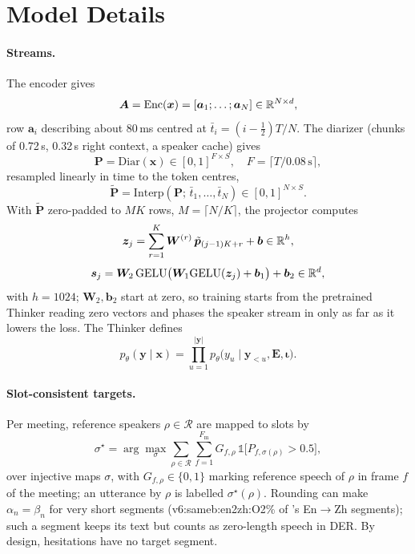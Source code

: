 \section{Model Details}
\label{app:model}

\paragraph{Streams.} The encoder gives
\begin{equation}
\bm{A}=\mathrm{Enc}(\bm{x})=[\bm{a}_1;\dots;\bm{a}_N]\in\mathbb{R}^{N\times d},
\label{eq:enc}
\end{equation}
row $\bm{a}_i$ describing about 80\,ms centred at $\bar{t}_i=(i-\tfrac12)T/N$. The diarizer (chunks of 0.72\,s, 0.32\,s right
context, a speaker cache) gives
\begin{equation}
\bm{P}=\mathrm{Diar}(\bm{x})\in[0,1]^{F\times S},\quad F=\lceil T/0.08\,\mathrm{s}\rceil,
\label{eq:diar}
\end{equation}
resampled linearly in time to the token centres,
\begin{equation}
\tilde{\bm{P}}=\mathrm{Interp}(\bm{P};\,\bar{t}_1,\dots,\bar{t}_N)\in[0,1]^{N\times S}.
\label{eq:interp}
\end{equation}
With $\tilde{\bm{P}}$ zero-padded to $MK$ rows, $M=\lceil N/K\rceil$, the projector computes
\begin{equation}
\bm{z}_j=\sum_{r=1}^{K}\bm{W}^{(r)}\,\tilde{\bm{p}}_{(j-1)K+r}+\bm{b}\in\mathbb{R}^{h},
\label{eq:conv}
\end{equation}
\begin{equation}
\bm{s}_j=\bm{W}_2\,\mathrm{GELU}\big(\bm{W}_1\mathrm{GELU}(\bm{z}_j)+\bm{b}_1\big)+\bm{b}_2\in\mathbb{R}^{d},
\label{eq:mlp}
\end{equation}
with $h=1024$; $\bm{W}_2,\bm{b}_2$ start at zero, so training starts from the pretrained Thinker reading zero vectors and
phases the speaker stream in only as far as it lowers the loss. The Thinker defines
\begin{equation}
p_\theta(\bm{y}\mid\bm{x})=\prod_{u=1}^{|\bm{y}|}p_\theta\big(y_u\mid \bm{y}_{<u},\bm{E},\bm{\iota}\big).
\label{eq:ar}
\end{equation}

\paragraph{Slot-consistent targets.} Per meeting, reference speakers $\rho\in\mathcal{R}$ are mapped to slots by
\begin{equation}
\sigma^\star=\arg\max_{\sigma}\sum_{\rho\in\mathcal{R}}\sum_{f=1}^{F_\text{m}}
G_{f,\rho}\,\mathds{1}\big[P_{f,\sigma(\rho)}>0.5\big],
\label{eq:slotmap}
\end{equation}
over injective maps $\sigma$, with $G_{f,\rho}\in\{0,1\}$ marking reference speech of $\rho$ in frame $f$ of the meeting;
an utterance by $\rho$ is labelled $\sigma^\star(\rho)$. Rounding can make $\alpha_n=\beta_n$ for very short segments
(\num{v6:sameb:en2zh:O2}\% of \sys{}'s En$\rightarrow$Zh segments); such a segment keeps its text but counts as
zero-length speech in DER. By design, hesitations have no target segment.

